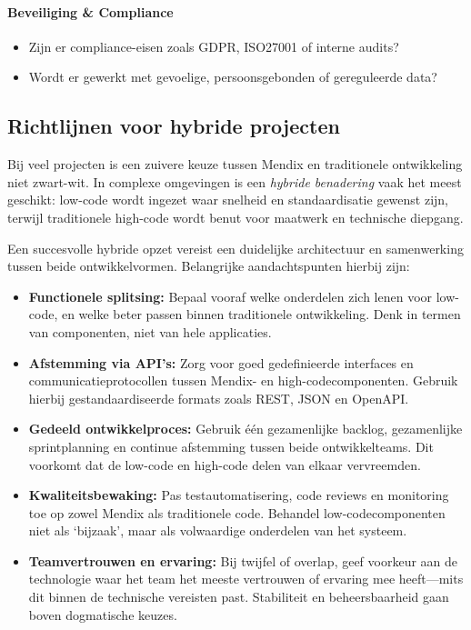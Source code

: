 \paragraph{Beveiliging \& Compliance}
\begin{itemize}
    \item Zijn er compliance-eisen zoals GDPR, ISO27001 of interne audits?
    \item Wordt er gewerkt met gevoelige, persoonsgebonden of gereguleerde data?
\end{itemize}


\subsection{Richtlijnen voor hybride projecten}
Bij veel projecten is een zuivere keuze tussen Mendix en traditionele ontwikkeling niet zwart-wit. In complexe omgevingen is een \textit{hybride benadering} vaak het meest geschikt: low-code wordt ingezet waar snelheid en standaardisatie gewenst zijn, terwijl traditionele high-code wordt benut voor maatwerk en technische diepgang.

Een succesvolle hybride opzet vereist een duidelijke architectuur en samenwerking tussen beide ontwikkelvormen. Belangrijke aandachtspunten hierbij zijn:

\begin{itemize}
    \item \textbf{Functionele splitsing:} Bepaal vooraf welke onderdelen zich lenen voor low-code, en welke beter passen binnen traditionele ontwikkeling. Denk in termen van componenten, niet van hele applicaties.
    
    \item \textbf{Afstemming via API’s:} Zorg voor goed gedefinieerde interfaces en communicatieprotocollen tussen Mendix- en high-codecomponenten. Gebruik hierbij gestandaardiseerde formats zoals REST, JSON en OpenAPI.
    
    \item \textbf{Gedeeld ontwikkelproces:} Gebruik één gezamenlijke backlog, gezamenlijke sprintplanning en continue afstemming tussen beide ontwikkelteams. Dit voorkomt dat de low-code en high-code delen van elkaar vervreemden.
    
    \item \textbf{Kwaliteitsbewaking:} Pas testautomatisering, code reviews en monitoring toe op zowel Mendix als traditionele code. Behandel low-codecomponenten niet als ‘bijzaak’, maar als volwaardige onderdelen van het systeem.
    
    \item \textbf{Teamvertrouwen en ervaring:} Bij twijfel of overlap, geef voorkeur aan de technologie waar het team het meeste vertrouwen of ervaring mee heeft—mits dit binnen de technische vereisten past. Stabiliteit en beheersbaarheid gaan boven dogmatische keuzes.
\end{itemize}

